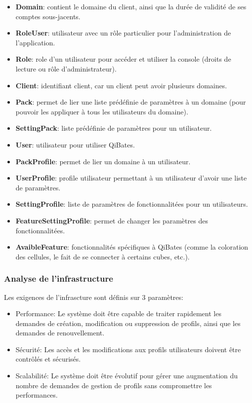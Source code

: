 \documentclass[a4paper, 11pt]{report}
\begin{document}
  \begin{itemize}
    \item \textbf{Domain}: contient le domaine du client, ainsi que la durée de validité de ses comptes sous-jacents.
    \item \textbf{RoleUser}: utilisateur avec un rôle particulier pour l'administration de l'application.
    \item \textbf{Role}: role d'un utilisateur pour accéder et utiliser la console (droits de lecture ou rôle d'administrateur).
    \item \textbf{Client}: identifiant client, car un client peut avoir plusieurs domaines.
    \item \textbf{Pack}: permet de lier une liste prédéfinie de paramètres à un domaine (pour pouvoir les appliquer à tous les utilisateurs du domaine).
    \item \textbf{SettingPack}: liste prédéfinie de paramètres pour un utilisateur.
    \item \textbf{User}: utilisateur pour utiliser QiBates.
    \item \textbf{PackProfile}: permet de lier un domaine à un utilisateur.
    \item \textbf{UserProfile}: profile utilisateur permettant à un utilisateur d'avoir une liste de paramètres.
    \item \textbf{SettingProfile}: liste de paramètres de fonctionnalitées pour un utilisateurs.
    \item \textbf{FeatureSettingProfile}: permet de changer les paramètres des fonctionnalitées.
    \item \textbf{AvaibleFeature}: fonctionnalités spécifiques à QiBates (comme la coloration des cellules, le fait de se connecter à certains cubes, etc.).
  \end{itemize}

\subsubsection{Analyse de l'infrastructure}
Les exigences de l'infrascture sont définis sur 3 paramètres:
\begin{itemize}
  \item Performance: Le système doit être capable de traiter rapidement les demandes de création, modification ou suppression de profils, ainsi que les demandes de renouvellement.
  \item Sécurité: Les accès et les modifications aux profils utilisateurs doivent être contrôlés et sécurisés.
  \item Scalabilité: Le système doit être évolutif pour gérer une augmentation du nombre de demandes de gestion de profils sans compromettre les performances.
\end{itemize}
\end{document}
